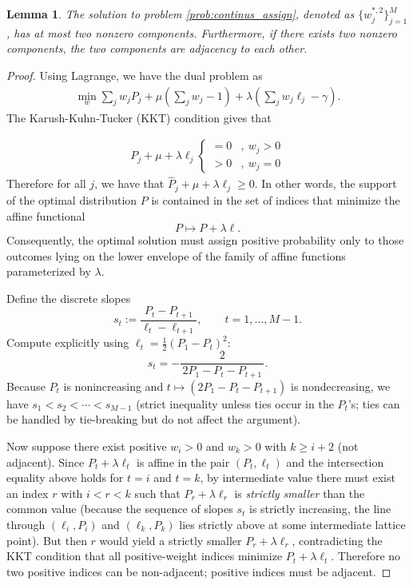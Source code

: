 \documentclass{article} %
\theoremstyle{plain} %
\newtheorem{lemma}[theorem]{Lemma}          %
\begin{document}
\begin{lemma}\label{lem:extreme_two_support}
The solution to problem \ref{prob:continus_assign}, denoted as $\{w^{\ast,2}_j\}_{j=1}^M$, has at most two nonzero components. Furthermore, if there exists two nonzero components, the two components are adjacency to each other.
\end{lemma}
\begin{proof}
Using Lagrange, we have the dual problem as
\begin{align*}
    \min_{w} \sum_{j} w_j{P}_j + \mu\left(\sum_{j} w_j - 1\right) +\lambda\left(\sum_{j} w_j \ell_j - \gamma\right).
\end{align*}
The Karush-Kuhn-Tucker (KKT) condition \citep{bertsekas1997nonlinear} gives that

\begin{align*}
{P}_j+\mu+\lambda\ell_j\left\{
\begin{aligned}
=0&,~w_j>0\\
>0&,~w_j=0
\end{aligned}\right.
\end{align*}
Therefore for all $j$, we have that $\hat{P}_j+\mu+\lambda\ell_j \geq 0$. In other words, the support of the optimal distribution $P$ is contained in the set of indices that minimize the affine functional
\begin{equation*}
    {P}\mapsto{P}+\lambda\ell.
\end{equation*}
Consequently, the optimal solution must assign positive probability only to those outcomes lying on the lower envelope of the family of affine functions parameterized by $\lambda$.

Define the discrete slopes
\[
s_t := \frac{P_t-P_{t+1}}{\ell_t-\ell_{t+1}},\qquad t=1,\dots,M-1.
\]
Compute explicitly using $\ell_t=\tfrac12(P_1-P_t)^2$:
\[
s_t = -\frac{2}{\,2P_1-P_t-P_{t+1}\,}.
\]
Because $P_t$ is nonincreasing and $t\mapsto(2P_1-P_t-P_{t+1})$ is nondecreasing, we have $s_1<s_2<\cdots<s_{M-1}$ (strict inequality unless ties occur in the $P_t$'s; ties can be handled by tie-breaking but do not affect the argument). 

Now suppose there exist positive $w_i>0$ and $w_k>0$ with $k\ge i+2$ (not adjacent). Since $P_t+\lambda\ell_t$ is affine in the pair $(P_t,\ell_t)$ and the intersection equality above holds for $t=i$ and $t=k$, by intermediate value there must exist an index $r$ with $i<r<k$ such that $P_r+\lambda\ell_r$ is \emph{strictly smaller} than the common value (because the sequence of slopes $s_t$ is strictly increasing, the line through $(\ell_i,P_i)$ and $(\ell_k,P_k)$ lies strictly above at some intermediate lattice point). But then $r$ would yield a strictly smaller $P_r+\lambda\ell_r$, contradicting the KKT condition that all positive-weight indices minimize $P_t+\lambda\ell_t$. Therefore no two positive indices can be non-adjacent; positive indices must be adjacent.
\end{proof}
\end{document}
